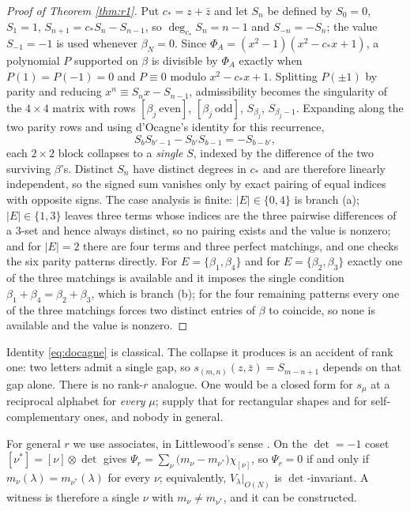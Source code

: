 \documentclass[11pt,reqno]{amsart}
\theoremstyle{plain}
\theoremstyle{definition}
\begin{document}
\begin{proof}[Proof of Theorem \ref{thm:r1}]
Put $c_\ast=z+\bar z$ and let $S_n$ be defined by $S_0=0$, $S_1=1$,
$S_{n+1}=c_\ast S_n-S_{n-1}$, so $\deg_{c_\ast}S_n=n-1$ and $S_{-n}=-S_n$; the value $S_{-1}=-1$ is
used whenever $\beta_N=0$. Since $\Phi_A=(x^2-1)(x^2-c_\ast x+1)$, a polynomial $P$ supported on
$\beta$ is divisible by $\Phi_A$ exactly when $P(1)=P(-1)=0$ and $P\equiv0$ modulo $x^2-c_\ast x+1$.
Splitting $P(\pm1)$ by parity and reducing $x^n\equiv S_nx-S_{n-1}$, admissibility becomes the
singularity of the $4\times4$ matrix with rows $[\beta_j\ \mathrm{even}]$,
$[\beta_j\ \mathrm{odd}]$, $S_{\beta_j}$, $S_{\beta_j-1}$. Expanding along the two parity rows and
using d'Ocagne's identity \cite{Doc} for this recurrence,
\begin{equation}\label{eq:docagne}
S_bS_{b'-1}-S_{b'}S_{b-1}=-S_{b-b'},
\end{equation}
each $2\times2$ block collapses to a \emph{single} $S$, indexed by the difference of the two
surviving $\beta$'s. Distinct $S_n$ have distinct degrees in $c_\ast$ and are therefore linearly
independent, so the signed sum vanishes only by exact pairing of equal indices with opposite signs.
The case analysis is finite: $|E|\in\{0,4\}$ is branch (a); $|E|\in\{1,3\}$ leaves three terms whose
indices are the three pairwise differences of a $3$-set and hence always distinct, so no pairing
exists and the value is nonzero; and for $|E|=2$ there are four terms and three perfect matchings,
and one checks the six parity patterns directly. For $E=\{\beta_1,\beta_4\}$ and for
$E=\{\beta_2,\beta_3\}$ exactly one of the three matchings is available and it imposes the single
condition $\beta_1+\beta_4=\beta_2+\beta_3$, which is branch (b); for the four remaining patterns
every one of the three matchings forces two distinct entries of $\beta$ to coincide, so none is
available and the value is nonzero.
\end{proof}

Identity \eqref{eq:docagne} is classical. The collapse it produces is an accident of rank one: two
letters admit a single gap, so $s_{(m,n)}(z,\bar z)=S_{m-n+1}$ depends on that gap alone. There is no
rank-$r$ analogue. One would be a closed form for $s_\mu$ at a reciprocal alphabet for \emph{every}
$\mu$; \cite{CK09} supply that for rectangular shapes and \cite{AB19} for self-complementary ones,
and nobody in general.

For general $r$ we use associates, in Littlewood's sense \cite{Lit50}. On the $\det=-1$ coset $[\nu^{*}]=[\nu]\otimes\det$ gives
$\Psi_r=\sum_\nu\big(m_\nu-m_{\nu^{*}}\big)\chi_{[\nu]}$, so $\Psi_r=0$ if and only if
$m_\nu(\lambda)=m_{\nu^{*}}(\lambda)$ for every $\nu$; equivalently, $V_\lambda|_{O(N)}$ is
$\det$-invariant. A witness is therefore a single $\nu$ with $m_\nu\ne m_{\nu^{*}}$, and it can be
constructed.
\end{document}
